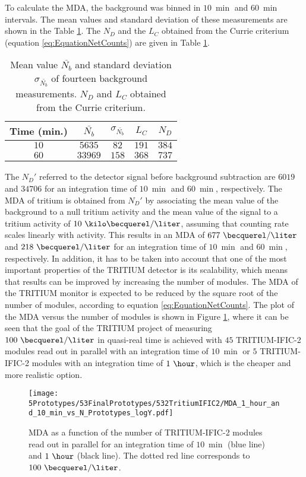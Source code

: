 To calculate the MDA, the background was binned in $10~\min$ and $60~\min$ intervals. The mean values and standard deviation of these measurements are shown in the Table \ref{tab:CurrieLawTRITIUMIFIC2}. The $N_D$ and the $L_C$ obtained from the Currie criterium (equation \ref{eq:EquationNetCounts}) are given in Table \ref{tab:CurrieLawTRITIUMIFIC2}.
\begin{table}[htbp]
\centering{}%
\begin{tabular}{ccccc}
\toprule 
Time (min.) & $\bar{N_b}$ & $\sigma_{\bar{N_b}}$ & $L_C$ & $N_D$ \tabularnewline
\midrule
\midrule 
$10$ & $5635$ & $82$ & $191$ & $384$ \tabularnewline
$60$ & $33969$ & $158$ & $368$ & $737$ \tabularnewline
\bottomrule
\end{tabular}
\caption{Mean value $\bar{N_b}$ and standard deviation $\sigma_{\bar{N_b}}$ of fourteen background measurements. $N_D$ and $L_C$ obtained from the Currie criterium.}
\label{tab:CurrieLawTRITIUMIFIC2}
\end{table}
The $N_D'$ referred to the detector signal before background subtraction are $6019$ and $34706$ for an integration time of $10~\min$ and $60~\min$, respectively. The MDA of tritium is obtained from $N_D'$ by associating the mean value of the background to a null tritium activity and the mean value of the signal to a tritium activity of $10~\kilo\becquerel/\liter$, assuming that counting rate scales linearly with activity. This results in an MDA of $677~\becquerel/\liter$ and $218~\becquerel/\liter$ for an integration time of $10~\min$ and $60~\min$, respectively. In addition, it has to be taken into account that one of the most important properties of the TRITIUM detector is its scalability, which means that results can be improved by increasing the number of modules. The MDA of the TRITIUM monitor is expected to be reduced by the square root of the number of modules, according to equation \ref{eq:EquationNetCounts}. The plot of the MDA versus the number of modules is shown in Figure \ref{fig:MDATRITIUMmonitor}, where it can be seen that the goal of the TRITIUM project of measuring $100~\becquerel/\liter$ in quasi-real time is achieved with $45$ TRITIUM-IFIC-2 modules read out in parallel with an integration time of $10~\min$ or $5$ TRITIUM-IFIC-2 modules with an integration time of $1~\hour$, which is the cheaper and more realistic option. %

\begin{figure}[h]
\centering
\texttt{[image: 5Prototypes/53FinalPrototypes/532TritiumIFIC2/MDA\_1\_hour\_and\_10\_min\_vs\_N\_Prototypes\_logY.pdf]}
\caption{MDA as a function of the number of TRITIUM-IFIC-2 modules read out in parallel for an integration time of $10~\min$ (blue line) and $1~\hour$ (black line). The dotted red line corresponds to $100~\becquerel/\liter$. \label{fig:MDATRITIUMmonitor}}
\end{figure}


